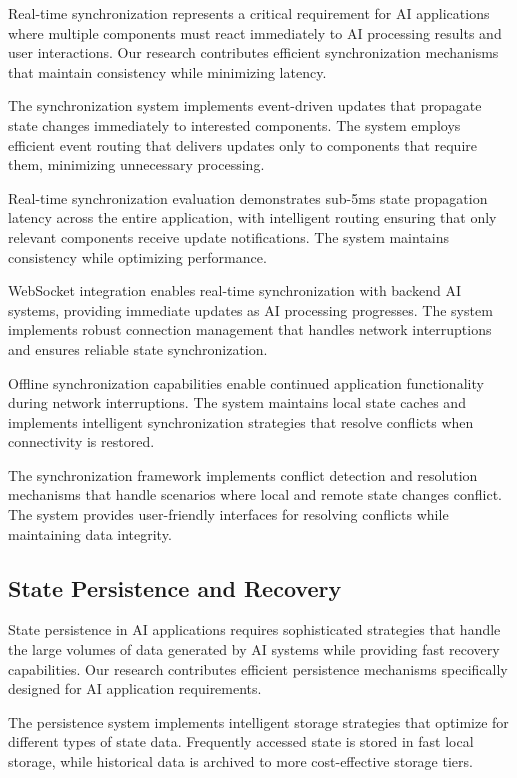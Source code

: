 Real-time synchronization represents a critical requirement for AI applications where multiple components must react immediately to AI processing results and user interactions. Our research contributes efficient synchronization mechanisms that maintain consistency while minimizing latency.

The synchronization system implements event-driven updates that propagate state changes immediately to interested components. The system employs efficient event routing that delivers updates only to components that require them, minimizing unnecessary processing.

\begin{successbox}
Real-time synchronization evaluation demonstrates sub-5ms state propagation latency across the entire application, with intelligent routing ensuring that only relevant components receive update notifications. The system maintains consistency while optimizing performance.
\end{successbox}

WebSocket integration enables real-time synchronization with backend AI systems, providing immediate updates as AI processing progresses. The system implements robust connection management that handles network interruptions and ensures reliable state synchronization.

Offline synchronization capabilities enable continued application functionality during network interruptions. The system maintains local state caches and implements intelligent synchronization strategies that resolve conflicts when connectivity is restored.

The synchronization framework implements conflict detection and resolution mechanisms that handle scenarios where local and remote state changes conflict. The system provides user-friendly interfaces for resolving conflicts while maintaining data integrity.

\subsection*{State Persistence and Recovery}

State persistence in AI applications requires sophisticated strategies that handle the large volumes of data generated by AI systems while providing fast recovery capabilities. Our research contributes efficient persistence mechanisms specifically designed for AI application requirements.

The persistence system implements intelligent storage strategies that optimize for different types of state data. Frequently accessed state is stored in fast local storage, while historical data is archived to more cost-effective storage tiers.

